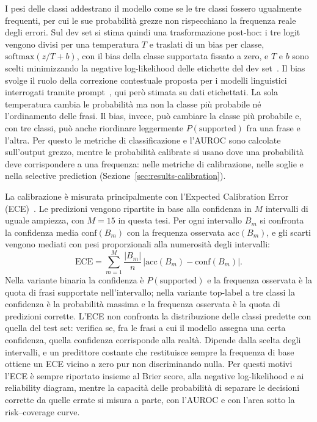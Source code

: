 I pesi delle classi addestrano il modello come se le tre classi fossero ugualmente frequenti, per cui le sue
probabilità grezze non rispecchiano la frequenza reale degli errori. Sul dev set si stima quindi una trasformazione
post-hoc: i tre logit vengono divisi per una temperatura $T$ e traslati di un bias per classe,
$\mathrm{softmax}(z / T + b)$, con il bias della classe supportata fissato a zero, e $T$ e $b$ sono scelti minimizzando
la negative log-likelihood delle etichette del dev set~\cite{guo2017calibration}. Il bias svolge il ruolo della
correzione contestuale proposta per i modelli linguistici interrogati tramite prompt~\cite{zhao2021calibrate}, qui
però stimata su dati etichettati. La sola temperatura cambia le probabilità ma non la classe più probabile né
l'ordinamento delle frasi. Il bias, invece, può cambiare la classe più probabile e, con tre classi, può anche
riordinare leggermente $P(\text{supported})$ fra una frase e l'altra. Per questo le metriche di classificazione e
l'AUROC sono calcolate sull'output grezzo, mentre le probabilità calibrate si usano dove una probabilità deve
corrispondere a una frequenza: nelle metriche di calibrazione, nelle soglie e nella selective prediction
(Sezione~\ref{sec:results-calibration}).

La calibrazione è misurata principalmente con l'Expected Calibration Error
(ECE)~\cite{naeini2015ece,guo2017calibration}. Le predizioni vengono ripartite in base alla confidenza in $M$
intervalli di uguale ampiezza, con $M = 15$ in questa tesi. Per ogni intervallo $B_m$ si confronta la confidenza media
$\mathrm{conf}(B_m)$ con la frequenza osservata $\mathrm{acc}(B_m)$, e gli scarti vengono mediati con pesi
proporzionali alla numerosità degli intervalli:
\begin{equation}
  \mathrm{ECE} = \sum_{m=1}^{M} \frac{|B_m|}{n} \, \bigl| \mathrm{acc}(B_m) - \mathrm{conf}(B_m) \bigr| .
\end{equation}
Nella variante binaria la confidenza è $P(\text{supported})$ e la frequenza osservata è la quota di frasi supportate
nell'intervallo; nella variante top-label a tre classi la confidenza è la probabilità massima e la frequenza osservata
è la quota di predizioni corrette. L'ECE non confronta la distribuzione delle classi predette con quella del test set:
verifica se, fra le frasi a cui il modello assegna una certa confidenza, quella confidenza corrisponde alla realtà.
Dipende dalla scelta degli intervalli, e un predittore costante che restituisce sempre la frequenza di base ottiene un
ECE vicino a zero pur non discriminando nulla. Per questi motivi l'ECE è sempre riportato insieme al Brier score, alla
negative log-likelihood e ai reliability diagram, mentre la capacità delle probabilità di separare le decisioni
corrette da quelle errate si misura a parte, con l'AUROC e con l'area sotto la risk--coverage curve.

